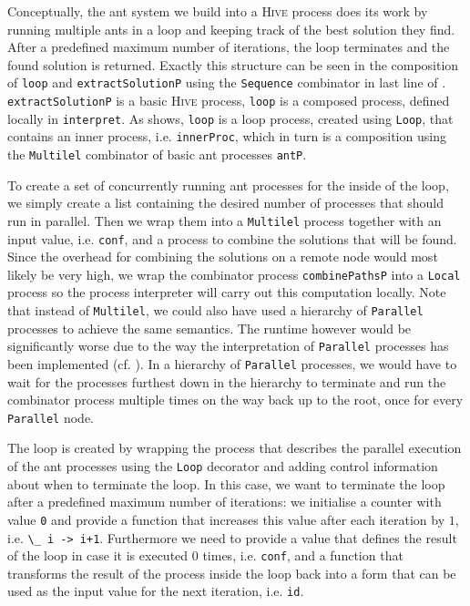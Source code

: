 Conceptually, the ant system we build into a \textsc{Hive} process does its work by running multiple ants in a loop and keeping track of the best solution they find. After a predefined maximum number of iterations, the loop terminates and the found solution is returned. Exactly this structure can be seen in the composition of \texttt{loop} and \texttt{extractSolutionP} using the \texttt{Sequence} combinator in last line of . \texttt{extractSolutionP} is a basic \textsc{Hive} process, \texttt{loop} is a composed process, defined locally in \texttt{interpret}. As  shows, \texttt{loop} is a loop process, created using \texttt{Loop}, that contains an inner process, i.e. \texttt{innerProc}, which in turn is a composition using the \texttt{Multilel} combinator of basic ant processes \texttt{antP}.

To create a set of concurrently running ant processes for the inside of the loop, we simply create a list containing the desired number of processes that should run in parallel. Then we wrap them into a \texttt{Multilel} process together with an input value, i.e. \texttt{conf}, and a process to combine the solutions that will be found. Since the overhead for combining the solutions on a remote node would most likely be very high, we wrap the combinator process \texttt{combinePathsP} into a \texttt{Local} process so the process interpreter will carry out this computation locally. Note that instead of \texttt{Multilel}, we could also have used a hierarchy of \texttt{Parallel} processes to achieve the same semantics. The runtime however would be significantly worse due to the way the interpretation of \texttt{Parallel} processes has been implemented (cf. ). In a hierarchy of \texttt{Parallel} processes, we would have to wait for the processes furthest down in the hierarchy to terminate and run the combinator process multiple times on the way back up to the root, once for every \texttt{Parallel} node.

The loop is created by wrapping the process that describes the parallel execution of the ant processes using the \texttt{Loop} decorator and adding control information about when to terminate the loop. In this case, we want to terminate the loop after a predefined maximum number of iterations: we initialise a counter with value \texttt{0} and provide a function that increases this value after each iteration by $1$, i.e. \texttt{\textbackslash\_ i -> i+1}. Furthermore we need to provide a value that defines the result of the loop in case it is executed $0$ times, i.e. \texttt{conf}, and a function that transforms the result of the process inside the loop back into a form that can be used as the input value for the next iteration, i.e. \texttt{id}.